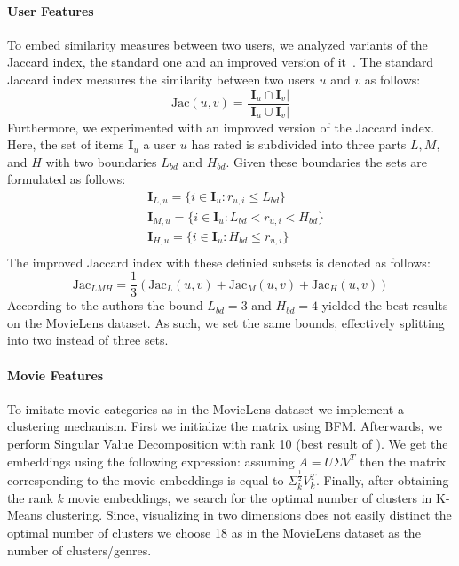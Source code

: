 \documentclass[10pt,conference,compsocconf]{IEEEtran}
\begin{document}
    \paragraph{User Features}
    To embed similarity measures between two users, we analyzed variants of the Jaccard index, the standard one and an improved version of it~\cite{lee_improving_2017}.
    The standard Jaccard index measures the similarity between two users $u$ and $v$ as follows:
    $$\text{Jac}(u,v)=\frac{|\mathbf{I}_u \cap \mathbf{I}_v|}{|\mathbf{I}_u \cup \mathbf{I}_v|}$$
    Furthermore, we experimented with an improved version of the Jaccard index.
    Here, the set of items $\mathbf{I}_u$ a user $u$ has rated is subdivided into three parts $L,M,$ and $H$ with two boundaries $L_{bd}$ and $H_{bd}$.
    Given these boundaries the sets are formulated as follows:
    \begin{align*}
        &\mathbf{I}_{L,u}=\{i \in \mathbf{I}_u : r_{u,i} \leq L_{bd}\}\\
        &\mathbf{I}_{M,u}=\{i \in \mathbf{I}_u : L_{bd} < r_{u,i} < H_{bd}\}\\
        &\mathbf{I}_{H,u}=\{i \in \mathbf{I}_u : H_{bd} \leq r_{u,i}\}\\
    \end{align*}
    The improved Jaccard index with these definied subsets is denoted as follows:
    $$\text{Jac}_{LMH}=\frac{1}{3}(\text{Jac}_L(u,v) + \text{Jac}_M(u,v) + \text{Jac}_H(u,v))$$
    According to the authors the bound $L_{bd} = 3$ and $H_{bd}=4$ yielded the best results on the MovieLens dataset.
    As such, we set the same bounds, effectively splitting into two instead of three sets.

    \paragraph{ Movie Features}
    To imitate movie categories as in the MovieLens dataset we implement a clustering mechanism.
    First we initialize the matrix using BFM.
    Afterwards, we perform Singular Value Decomposition with rank 10 (best result of ).
    We get the embeddings using the following expression: assuming $A=U\Sigma V^T$ then the matrix corresponding to the movie embeddings is equal to $\Sigma _k ^{\frac{1}{2}} V_k ^T$.
    Finally, after obtaining the rank $k$ movie embeddings, we search for the optimal number of clusters in K-Means clustering.
    Since, visualizing in two dimensions does not easily distinct the optimal number of clusters we choose 18 as in the MovieLens dataset as the number of clusters/genres.
\end{document}
